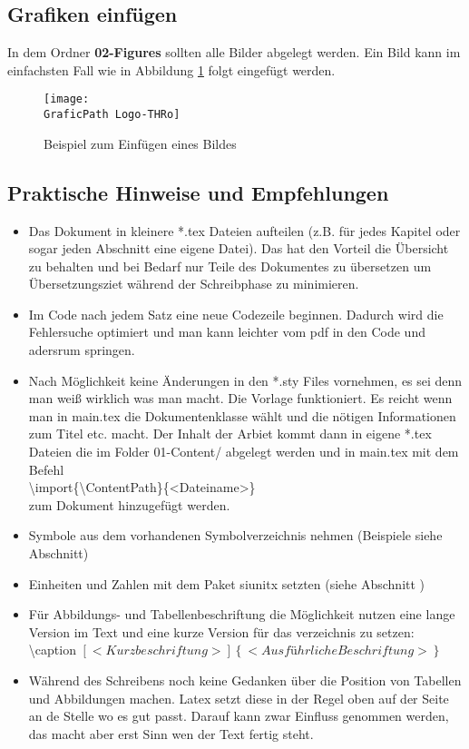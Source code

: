 \subsection{Grafiken einfügen}
In dem Ordner \textbf{02-Figures} sollten alle Bilder abgelegt werden.
Ein Bild kann im einfachsten Fall wie in Abbildung \ref{fig:my_exampleFigure} folgt eingefügt werden.
\begin{figure}
    \centering %
    \texttt{[image: \\GraficPath Logo-THRo]}
    \caption{Beispiel zum Einfügen eines Bildes} %
    \label{fig:my_exampleFigure}
\end{figure}

\subsection{Praktische Hinweise und Empfehlungen}
\begin{itemize}
	\item Das Dokument in kleinere *.tex Dateien aufteilen (z.B. für jedes Kapitel oder sogar jeden Abschnitt eine eigene Datei). 
	Das hat den Vorteil die Übersicht zu behalten und bei Bedarf nur Teile des Dokumentes zu übersetzen um Übersetzungsziet während der Schreibphase zu minimieren.
	\item Im Code nach jedem Satz eine neue Codezeile beginnen.
	Dadurch wird die Fehlersuche optimiert und man kann leichter vom pdf in den Code und adersrum springen.
	\item Nach Möglichkeit keine Änderungen in den *.sty Files vornehmen, es sei denn man weiß wirklich was man macht.
	Die Vorlage funktioniert. Es reicht wenn man in main.tex die Dokumentenklasse wählt und die nötigen Informationen zum Titel etc. macht.
	Der Inhalt der Arbiet kommt dann in eigene *.tex Dateien die im Folder 01-Content/ abgelegt werden und in main.tex mit dem Befehl
	\\
	\textbackslash import\{\textbackslash ContentPath\}\{<Dateiname>\}
	\\
	zum Dokument hinzugefügt werden.
	\item Symbole aus dem vorhandenen Symbolverzeichnis nehmen (Beispiele siehe Abschnitt)
	\item Einheiten und Zahlen mit dem Paket siunitx setzten (siehe Abschnitt )
	\item Für Abbildungs- und Tabellenbeschriftung die Möglichkeit nutzen eine lange Version im Text und eine kurze Version für das verzeichnis zu setzen:
	\\
	\textbackslash caption $ \left[  <Kurzbeschriftung>  \right] \left\lbrace <Ausführliche Beschriftung> \right\rbrace $
	\item Während des Schreibens noch keine Gedanken über die Position von Tabellen und Abbildungen machen.
	Latex setzt diese in der Regel oben auf der Seite an de Stelle wo es gut passt.
	Darauf kann zwar Einfluss genommen werden, das macht aber erst Sinn wen der Text fertig steht.
\end{itemize}
\newpage


